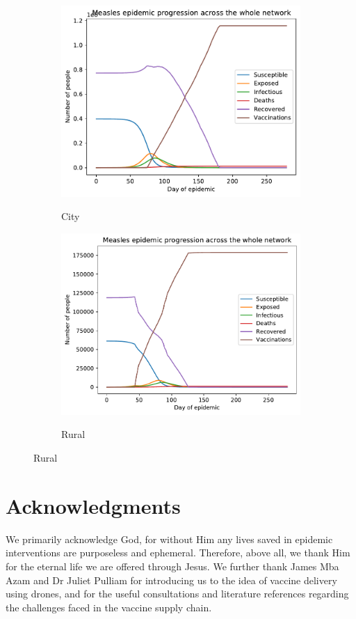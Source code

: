 \documentclass[10pt,letterpaper]{article}
\begin{document}
\begin{figure}[ht!]
\begin{subfigure}[b]{0.5\textwidth}
    \includegraphics[width=\textwidth]{figures/base_vaccs/city_20km_vaccs.pdf}
    \label{si:vaccs_city}
    \caption{City}
  \end{subfigure}
  \begin{subfigure}[b]{0.5\textwidth}
    \includegraphics[width=\textwidth]{figures/base_vaccs/rural_150km_vaccs.pdf}
    \label{si:vaccs_rural}
    \caption{Rural}
  \end{subfigure}
\end{figure}

\section*{Acknowledgments}
We primarily acknowledge God, for without Him any lives saved in epidemic interventions are purposeless and ephemeral. Therefore, above all, we thank Him for the eternal life we are offered through Jesus.
We further thank James Mba Azam and Dr Juliet Pulliam for introducing us to the idea of vaccine delivery using drones, and for the useful consultations and literature references regarding the challenges faced in the vaccine supply chain.
\end{document}
